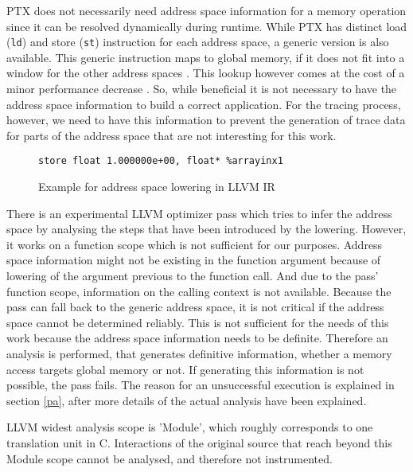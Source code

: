 PTX does not necessarily need address space information for a memory operation since it can be resolved dynamically during runtime. While PTX has distinct load (\verb|ld|) and store (\verb|st|) instruction for
each address space, a generic version is also available. This generic instruction maps to global memory, if
it does not fit into a window for the other address spaces \cite{ptx isa}. This lookup however comes at the cost of a minor performance decrease \cite{infer-pass}. So, while beneficial it is not necessary to
have the address space information to build a correct application. For the tracing process, however, we need to have this information to prevent the generation of trace data for parts of the address space that are not interesting for this work.

\begin{figure}
	\begin{lstlisting}[style=C]
%arrayinx1 = getelementptr inbounds (float, float* addrspacecast (float addrspace(3)* @_ZZ5saxpyfPfS_iPlS0_E2_x to float*), i64 0, i64 2)
store float 1.000000e+00, float* %arrayinx1
	\end{lstlisting}
	\caption{Example for address space lowering in LLVM IR}
	\label{lowering}
\end{figure}

There is an experimental LLVM optimizer pass which tries to infer the address space by analysing the steps that have been introduced by the lowering. However, it works on a function scope which is not sufficient for our purposes. Address space information  might not be existing in the function argument because of lowering of the argument previous to the function call. And due to the pass' function scope, information on the calling context is not available. Because the pass can fall back to the generic address space,
it is not critical if the address space cannot be determined reliably. This is not sufficient for the needs of this work because the address space information needs to be definite.
Therefore an  analysis is performed, that generates definitive information, whether a memory access targets
global memory or not. If generating this information is not possible, the pass fails. The reason for an unsuccessful execution is  explained in section \ref{pa}, after more details of the actual analysis have been explained.

LLVM widest analysis scope is 'Module', which roughly corresponds to one translation unit in C. Interactions of the original source that reach beyond this Module scope cannot be analysed, and therefore not instrumented.

